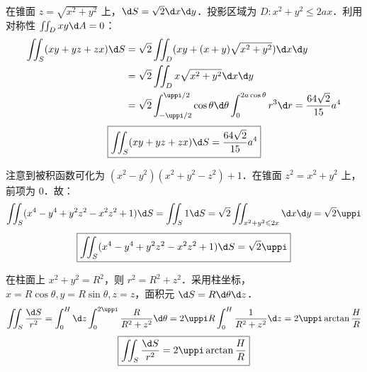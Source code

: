 \begin{solution}

    在锥面 $z=\sqrt{x^2+y^2}$ 上，$\d S = \sqrt{2} \d x \d y$．投影区域为 $D: x^2+y^2 \leqslant 2ax$．利用对称性 $\iint_D xy \d A = 0$：
    \begin{equation}
        \begin{aligned}
            \iint_{S} (xy+yz+zx) \d S & = \sqrt{2} \iint_{D} (xy + (x+y)\sqrt{x^2+y^2}) \d x \d y                                                                \\
                                      & = \sqrt{2} \iint_{D} x\sqrt{x^2+y^2} \d x \d y                                                                           \\
                                      & = \sqrt{2} \int_{-\uppi/2}^{\uppi/2} \cos \theta \d \theta \int_{0}^{2a\cos \theta} r^3 \d r = \frac{64\sqrt{2}}{15} a^4
        \end{aligned}
    \end{equation}
    \begin{equation}
        \boxed{\iint_{S} (xy+yz+zx) \d S = \frac{64\sqrt{2}}{15} a^4}
    \end{equation}


    注意到被积函数可化为 $(x^2-y^2)(x^2+y^2-z^2) + 1$．在锥面 $z^2 = x^2+y^2$ 上，前项为 $0$．故：
    \begin{equation}
        \iint_{S} (x^4-y^4+y^2z^2-x^2z^2+1) \d S = \iint_{S} 1 \d S = \sqrt{2} \iint_{x^2+y^2 \leqslant 2x} \d x \d y = \sqrt{2} \uppi
    \end{equation}
    \begin{equation}
        \boxed{\iint_{S} (x^4-y^4+y^2z^2-x^2z^2+1) \d S = \sqrt{2}\uppi}
    \end{equation}


    在柱面上 $x^2+y^2=R^2$，则 $r^2 = R^2+z^2$．采用柱坐标，$x=R\cos\theta, y=R\sin\theta, z=z$，面积元 $\d S = R \d \theta \d z$．
    \begin{equation}
        \iint_{S} \frac{\d S}{r^2} = \int_{0}^{H} \d z \int_{0}^{2\uppi} \frac{R}{R^2+z^2} \d \theta = 2\uppi R \int_{0}^{H} \frac{1}{R^2+z^2} \d z = 2\uppi \arctan \frac{H}{R}
    \end{equation}
    \begin{equation}
        \boxed{\iint_{S} \frac{\d S}{r^2} = 2\uppi \arctan \frac{H}{R}}
    \end{equation}


\end{solution}
